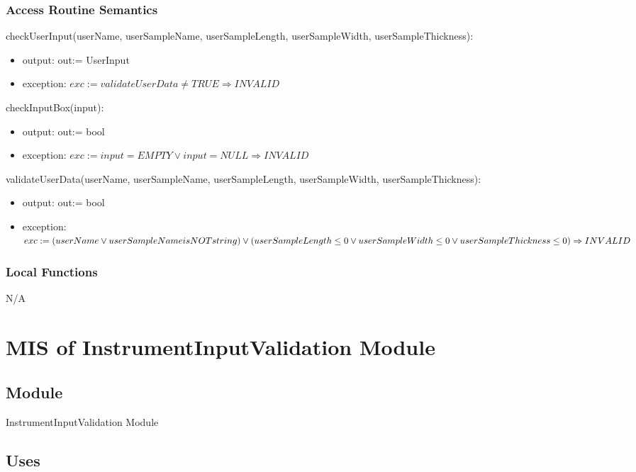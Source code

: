 \documentclass[12pt, titlepage]{article}
\begin{document}
\subsubsection{Access Routine Semantics}

\noindent checkUserInput(userName, userSampleName, userSampleLength, userSampleWidth, userSampleThickness):
\begin{itemize}
\item output: out:= UserInput
\item exception: $exc:= 
validateUserData \ne TRUE
\Rightarrow INVALID$
\end{itemize}

\noindent checkInputBox(input):
\begin{itemize}
\item output: out:= bool
\item exception: $exc:= 
input = EMPTY \lor input = NULL
\Rightarrow INVALID$
\end{itemize}

\noindent validateUserData(userName, userSampleName, userSampleLength, userSampleWidth, userSampleThickness):
\begin{itemize}
\item output: out:= bool
\item exception: $exc:= 
 (userName \lor userSampleName is NOT string ) \lor
 (userSampleLength \le 0 \lor userSampleWidth \le 0 \lor userSampleThickness \le 0) \\
\Rightarrow INVALID$
\end{itemize}

\subsubsection{Local Functions}
N/A
\newpage


\section{MIS of InstrumentInputValidation Module} \label{HI}
\subsection{Module}

InstrumentInputValidation Module

\subsection{Uses}
\end{document}
